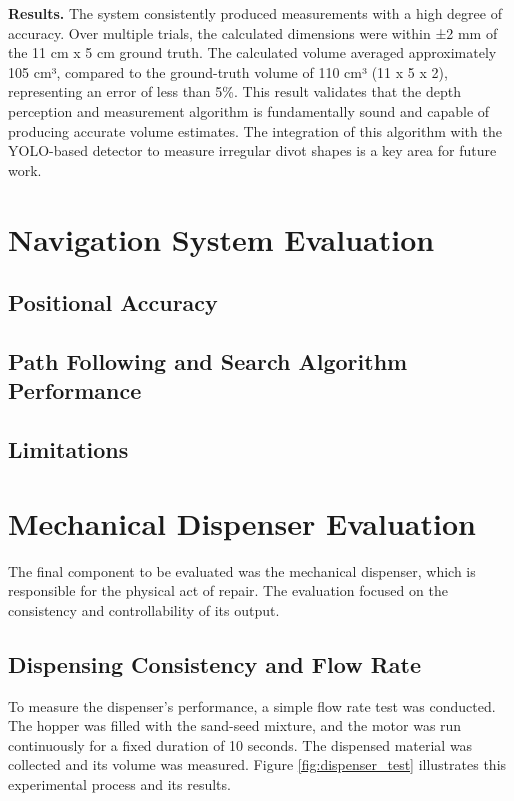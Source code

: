 \textbf{Results.}
The system consistently produced measurements with a high degree of accuracy. Over multiple trials, the calculated dimensions were within ±2 mm of the 11 cm x 5 cm ground truth. The calculated volume averaged approximately 105 cm³, compared to the ground-truth volume of 110 cm³ (11 x 5 x 2), representing an error of less than 5\%. This result validates that the depth perception and measurement algorithm is fundamentally sound and capable of producing accurate volume estimates. The integration of this algorithm with the YOLO-based detector to measure irregular divot shapes is a key area for future work.

\section{Navigation System Evaluation}
\subsection{Positional Accuracy}
\subsection{Path Following and Search Algorithm Performance}
\subsection{Limitations}

\section{Mechanical Dispenser Evaluation}
\label{sec:dispenser_evaluation}
The final component to be evaluated was the mechanical dispenser, which is responsible for the physical act of repair. The evaluation focused on the consistency and controllability of its output.

\subsection{Dispensing Consistency and Flow Rate}
To measure the dispenser's performance, a simple flow rate test was conducted. The hopper was filled with the sand-seed mixture, and the motor was run continuously for a fixed duration of 10 seconds. The dispensed material was collected and its volume was measured. Figure \ref{fig:dispenser_test} illustrates this experimental process and its results.

